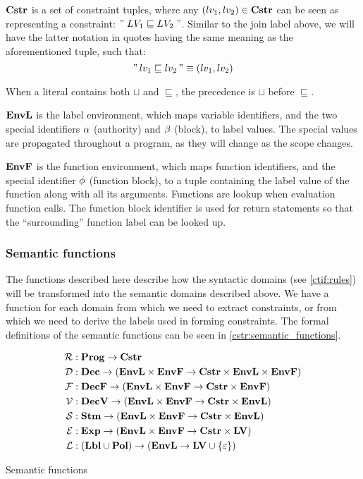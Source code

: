 $\mathbf{Cstr}$ is a set of constraint tuples, where any $(lv_1, lv_2) \in \mathbf{Cstr}$ can be seen as representing a constraint: $" \; LV_1 \sqsubseteq LV_2 \; "$.
Similar to the join label above, we will have the latter notation in quotes having the same meaning as the aforementioned tuple, such that:
\[ "\,lv_1 \sqsubseteq lv_2\," \equiv (lv_1, lv_2) \]

When a literal contains both $\sqcup$ and $\sqsubseteq$, the precedence is $\sqcup$ before $\sqsubseteq$.

$\mathbf{EnvL}$ is the label environment, which maps variable identifiers, and the two special identifiers $\alpha$ (authority) and $\beta$ (block), to label values.
The special values are propagated throughout a program, as they will change as the scope changes.

$\mathbf{EnvF}$ is the function environment, which maps function identifiers, and the special identifier $\phi$ (function block), to a tuple containing the label value of the function along with all its arguments.
Functions are lookup when evaluation function calls.
The function block identifier is used for return statements so that the ``surrounding'' function label can be looked up.

\subsubsection{Semantic functions}
The functions described here describe how the syntactic domains (see \cref{ctif:rules}) will be transformed into the semantic domains described above.
We have a function for each domain from which we need to extract constraints, or from which we need to derive the labels used in forming constraints.
The formal definitions of the semantic functions can be seen in \cref{cstr:semantic_functions}.

\begin{table}[H]
\begin{align*}
  \mathcal{R} & : \mathbf{Prog} \rightarrow \mathbf{Cstr} \\
  \mathcal{D} & : \mathbf{Dec} \rightarrow (\mathbf{EnvL} \times \mathbf{EnvF} \rightarrow \mathbf{Cstr} \times \mathbf{EnvL} \times \mathbf{EnvF}) \\
  \mathcal{F} & : \mathbf{DecF} \rightarrow (\mathbf{EnvL} \times \mathbf{EnvF} \rightarrow \mathbf{Cstr} \times \mathbf{EnvF}) \\
  \mathcal{V} & : \mathbf{DecV} \rightarrow (\mathbf{EnvL} \times \mathbf{EnvF} \rightarrow \mathbf{Cstr} \times \mathbf{EnvL}) \\
  \mathcal{S} & : \mathbf{Stm} \rightarrow (\mathbf{EnvL} \times \mathbf{EnvF} \rightarrow \mathbf{Cstr} \times \mathbf{EnvL}) \\
  \mathcal{E} & : \mathbf{Exp} \rightarrow (\mathbf{EnvL} \times \mathbf{EnvF} \rightarrow \mathbf{Cstr} \times \mathbf{LV}) \\
  \mathcal{L} & : (\mathbf{Lbl} \cup \mathbf{Pol}) \rightarrow (\mathbf{EnvL} \rightarrow \mathbf{LV} \cup \{ \varepsilon \})
\end{align*}
\caption{Semantic functions}
\label{cstr:semantic_functions}
\end{table}

